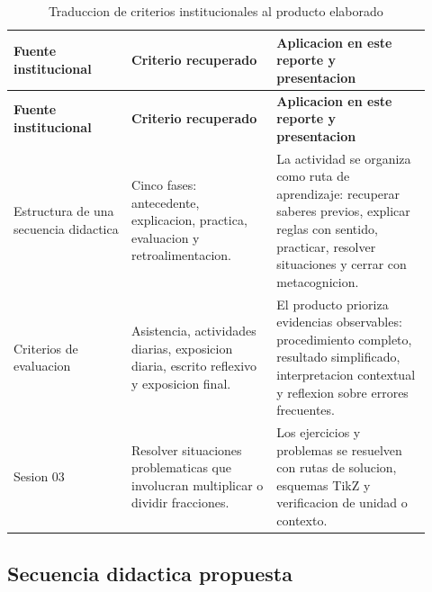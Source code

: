 \documentclass[
	spanish,
	letterpaper, oneside
]{article}
\begin{document}
\begin{longtable}{@{}p{0.26\linewidth}p{0.32\linewidth}p{0.34\linewidth}@{}}
	\caption{Traduccion de criterios institucionales al producto elaborado}\label{tab:criterios-institucionales-s03}\\
	\toprule
	\textbf{Fuente institucional} & \textbf{Criterio recuperado} & \textbf{Aplicacion en este reporte y presentacion} \\
	\midrule
	\endfirsthead
	\toprule
	\textbf{Fuente institucional} & \textbf{Criterio recuperado} & \textbf{Aplicacion en este reporte y presentacion} \\
	\midrule
	\endhead
	Estructura de una secuencia didactica & Cinco fases: antecedente, explicacion, practica, evaluacion y retroalimentacion. & La actividad se organiza como ruta de aprendizaje: recuperar saberes previos, explicar reglas con sentido, practicar, resolver situaciones y cerrar con metacognicion. \\
	Criterios de evaluacion & Asistencia, actividades diarias, exposicion diaria, escrito reflexivo y exposicion final. & El producto prioriza evidencias observables: procedimiento completo, resultado simplificado, interpretacion contextual y reflexion sobre errores frecuentes. \\
	Sesion 03 & Resolver situaciones problematicas que involucran multiplicar o dividir fracciones. & Los ejercicios y problemas se resuelven con rutas de solucion, esquemas TikZ y verificacion de unidad o contexto. \\
	\bottomrule
\end{longtable}

\subsection{Secuencia didactica propuesta}
\end{document}
